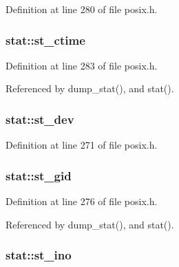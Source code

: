 Definition at line 280 of file posix.\-h.

\hypertarget{structstat_a1b4b858db1ebe79c3d6e0fc1ef721024}{
\subsubsection[{st\-\_\-ctime}]{ stat\-::st\-\_\-ctime}}\label{structstat_a1b4b858db1ebe79c3d6e0fc1ef721024}


Definition at line 283 of file posix.\-h.



Referenced by dump\-\_\-stat(), and stat().

\hypertarget{structstat_ac5b90090ae323741ae4c9e4f3683a29f}{
\subsubsection[{st\-\_\-dev}]{ stat\-::st\-\_\-dev}}\label{structstat_ac5b90090ae323741ae4c9e4f3683a29f}


Definition at line 271 of file posix.\-h.

\hypertarget{structstat_ab864f16f436cec370f0ced585d897698}{
\subsubsection[{st\-\_\-gid}]{ stat\-::st\-\_\-gid}}\label{structstat_ab864f16f436cec370f0ced585d897698}


Definition at line 276 of file posix.\-h.



Referenced by dump\-\_\-stat(), and stat().

\hypertarget{structstat_a9769ed8f0d4c5a9f329c32bc92479d56}{
\subsubsection[{st\-\_\-ino}]{ stat\-::st\-\_\-ino}}\label{structstat_a9769ed8f0d4c5a9f329c32bc92479d56}


